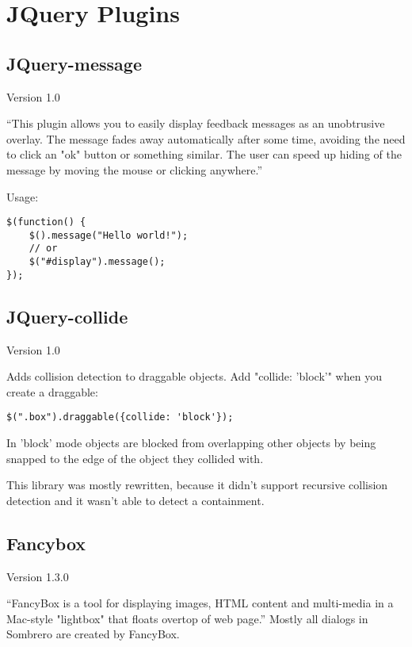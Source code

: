 \section{JQuery Plugins}
\subsection{JQuery-message}
    Version 1.0

    ``This plugin allows you to easily display feedback messages as an unobtrusive overlay. The message fades away automatically after some time, avoiding the need to click an "ok" button or something similar. The user can speed up hiding of the message by moving the mouse or clicking anywhere.''\cite{bassistance.de}

    Usage:
\begin{lstlisting}[caption=JQuery message,label=lst:plugin:message]
$(function() {
    $().message("Hello world!");
    // or
    $("#display").message();
});
\end{lstlisting}

\subsection{JQuery-collide}
    Version 1.0

    Adds collision detection to draggable objects.
    Add "collide: 'block'" when you create a draggable:

\begin{lstlisting}[caption=collison detection,label=lst:plugin:collide]
$(".box").draggable({collide: 'block'});
\end{lstlisting}
    In 'block' mode objects are blocked from overlapping other objects by being snapped to the edge of the object they collided with.

    This library was mostly rewritten, because it didn't support recursive collision detection and it wasn't able to detect a containment.
\subsection{Fancybox}
Version 1.3.0

``FancyBox is a tool for displaying images, HTML content and multi-media in a Mac-style "lightbox" that floats overtop of web page.''\cite{fancybox.net} Mostly all dialogs in Sombrero are created by FancyBox.

